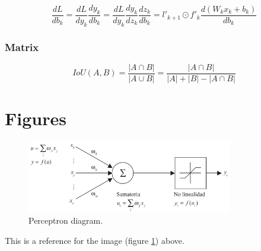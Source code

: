 \documentclass{article} %
\begin{document}
$$\frac{dL}{db_k}=\frac{dL}{dy_k}\frac{dy_k}{db_k}=\frac{dL}{dy_k}\frac{dy_k}{dz_k}\frac{dz_k}{db_k}=l'_{k+1}\odot f'_k\frac{d(W_kx_k+b_k)}{db_k}$$

\subsubsection{Matrix}

\begin{equation}
IoU(A,B)=\frac{|A \cap B|}{|A \cup B|}=\frac{|A \cap B|}{|A| + |B| - |A \cap B|}
\end{equation}

\cleardoublepage

\section{Figures} %

\begin{figure}[H]
	\centering
	\includegraphics[width=0.8\textwidth]{images/perceptron-graph}
	\caption{Perceptron diagram.}
	\label{fig:perceptron-graph}
\end{figure}

This is a reference for the image (figure \ref{fig:perceptron-graph}) above.
\end{document}
